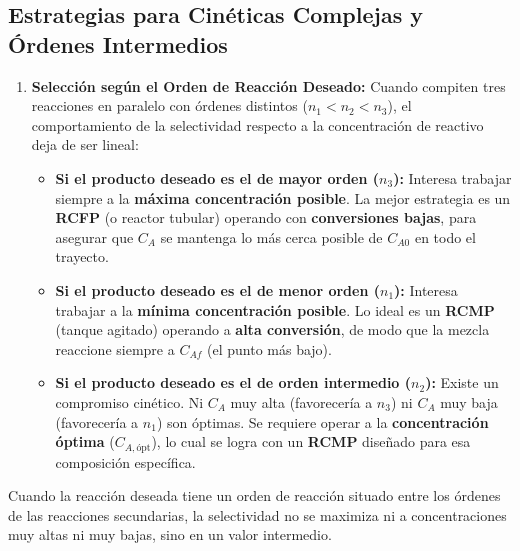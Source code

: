 \subsection{Estrategias para Cinéticas Complejas y Órdenes Intermedios}
\begin{enumerate}
  \item \textbf{Selección según el Orden de Reacción Deseado:}
        Cuando compiten tres reacciones en paralelo con órdenes distintos ($n_1 < n_2 < n_3$), el comportamiento de la selectividad respecto a la concentración de reactivo deja de ser lineal:

        \begin{itemize}
          \item \textbf{Si el producto deseado es el de mayor orden ($n_3$):}
                Interesa trabajar siempre a la \textbf{máxima concentración posible}. La mejor estrategia es un \textbf{RCFP} (o reactor tubular) operando con \textbf{conversiones bajas}, para asegurar que $C_A$ se mantenga lo más cerca posible de $C_{A0}$ en todo el trayecto.

          \item \textbf{Si el producto deseado es el de menor orden ($n_1$):}
                Interesa trabajar a la \textbf{mínima concentración posible}. Lo ideal es un \textbf{RCMP} (tanque agitado) operando a \textbf{alta conversión}, de modo que la mezcla reaccione siempre a $C_{Af}$ (el punto más bajo).

          \item \textbf{Si el producto deseado es el de orden intermedio ($n_2$):}
                Existe un compromiso cinético. Ni $C_A$ muy alta (favorecería a $n_3$) ni $C_A$ muy baja (favorecería a $n_1$) son óptimas. Se requiere operar a la \textbf{concentración óptima} ($C_{A, \text{ópt}}$), lo cual se logra con un \textbf{RCMP} diseñado para esa composición específica.
        \end{itemize}
\end{enumerate}

\noindent Cuando la reacción deseada tiene un orden de reacción situado entre los órdenes de las reacciones secundarias, la selectividad no se maximiza ni a concentraciones muy altas ni muy bajas, sino en un valor intermedio.

